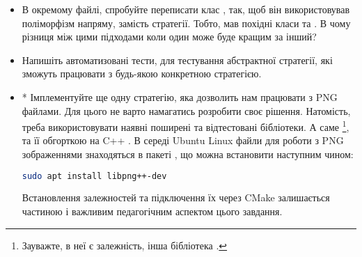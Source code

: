 \documentclass[12pt]{article}
\begin{document}
\begin{itemize}
\item В окремому файлі, спробуйте переписати клас , так, щоб він використовував поліморфізм напряму, замість стратегії. Тобто, мав похідні класи  та . В чому різниця між цими підходами коли один може буде кращим за інший? 
\item Напишіть автоматизовані тести, для тестування абстрактної стратегії, які зможуть працювати з будь-якою конкретною стратегією.
\item* Імплементуйте ще одну стратегію, яка дозволить нам працювати з PNG файлами. Для цього не варто намагатись розробити своє рішення. Натомість, треба використовувати наявні поширені та відтестовані бібліотеки. А саме \href{http://www.libpng.org/pub/png/libpng.html}{}\footnote{Зауважте, в неї є залежність, інша бібліотека .}, та її обгорткою на C++ \href{https://www.nongnu.org/pngpp/doc/0.2.9/}{}. В середі Ubuntu Linux файли для роботи з PNG зображеннями знаходяться в пакеті , що можна встановити наступним чином:
\begin{lstlisting}[language=sh]
sudo apt install libpng++-dev
\end{lstlisting}
Встановлення залежностей та підключення їх через CMake залишається частиною і важливим педагогічним аспектом цього завдання.

\end{itemize}
\end{document}
